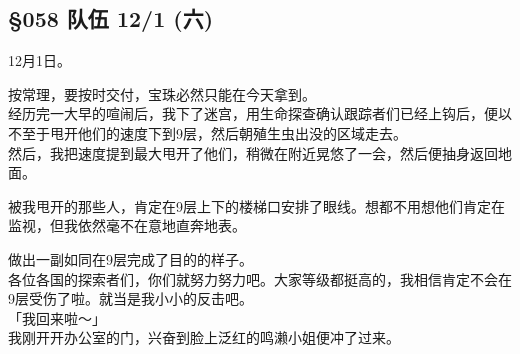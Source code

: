 \subsection{§058 队伍 12/1 (六)}

12月1日。

按常理，要按时交付，宝珠必然只能在今天拿到。\\

经历完一大早的喧闹后，我下了迷宫，用生命探查确认跟踪者们已经上钩后，便以不至于甩开他们的速度下到9层，然后朝殖生虫出没的区域走去。\\

然后，我把速度提到最大甩开了他们，稍微在附近晃悠了一会，然后便抽身返回地面。

被我甩开的那些人，肯定在9层上下的楼梯口安排了眼线。想都不用想他们肯定在监视，但我依然毫不在意地直奔地表。

做出一副如同在9层完成了目的的样子。\\

各位各国的探索者们，你们就努力努力吧。大家等级都挺高的，我相信肯定不会在9层受伤了啦。就当是我小小的反击吧。\\

「我回来啦～」\\

我刚开开办公室的门，兴奋到脸上泛红的鸣濑小姐便冲了过来。\\

